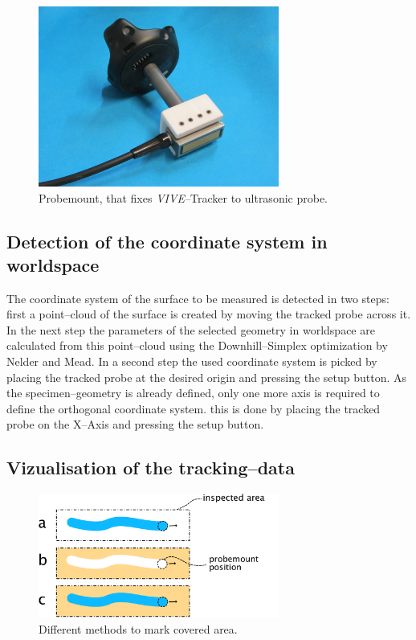 \documentclass{VRARWorkshop}
\begin{document}
\begin{figure}[h!]
  \label{fig:probemount}
    \begin{center}
        \includegraphics[width=79mm]{images/probemount.jpg}
        \caption{\label{fig:probemount} Probemount, that fixes \textit{VIVE--}Tracker to ultrasonic probe.}
    \end{center}
\end{figure}

\subsection{Detection of the coordinate system in worldspace}
The coordinate system of the surface to be measured is detected in two steps:
first a point--cloud of the surface is created by moving the tracked probe across it.
In the next step the parameters of the selected geometry in worldspace are calculated from this point--cloud using the Downhill--Simplex optimization by Nelder and Mead.
In a second step the used coordinate system is picked by placing the tracked probe at the desired origin and pressing the setup button.
As the specimen--geometry is already defined, only one more axis is required to define the orthogonal coordinate system.
this is done by placing the tracked probe on the X--Axis and pressing the setup button.

\subsection{Vizualisation of the tracking--data}

\begin{figure}[h!]
    \begin{center}
        \includegraphics[width=79mm]{images/DrawVsErase.pdf}
        \caption{\label{fig:DrawVsErase} Different methods to mark covered area.}
    \end{center}
\end{figure}
\end{document}
